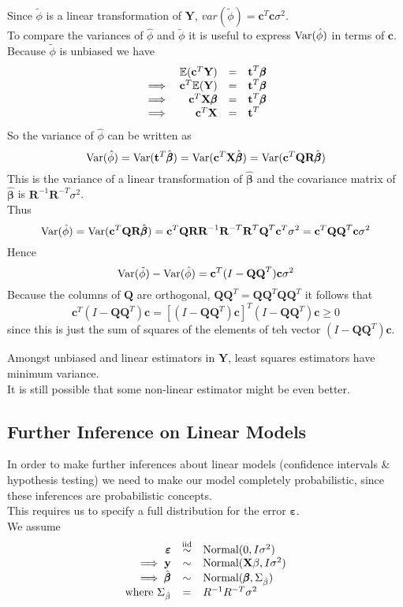 \documentclass[11pt,a4paper]{article}
\begin{document}
Since $\tilde\phi$ is a linear transformation of $\textbf{Y}$, $var(\tilde\phi)=\textbf{c}^T\textbf{c}\sigma^2$.\\
To compare the variances of $\hat\phi$ and $\tilde\phi$ it is useful to express $\mathrm{Var}(\hat\phi)$ in terms of $\textbf{c}$.\\
Because $\tilde\phi$ is unbiased we have
\[\begin{array}{rrcl}
&\mathbb{E}(\textbf{c}^T\textbf{Y})&=&\textbf{t}^T\pmb\beta\\
\implies&\textbf{c}^T\mathbb{E}(\textbf{Y})&=&\textbf{t}^T\pmb\beta\\
\implies&\textbf{c}^T\textbf{X}\pmb\beta&=&\textbf{t}^T\pmb\beta\\
\implies&\textbf{c}^T\textbf{X}&=&\textbf{t}^T
\end{array}\]
So the variance of $\hat\phi$ can be written as
$$\mathrm{Var}(\hat\phi)=\mathrm{Var}(\textbf{t}^T\hat{\pmb\beta})=\mathrm{Var}(\textbf{c}^T\textbf{X}\hat{\pmb\beta})=\mathrm{Var}(\textbf{c}^T\textbf{QR}\hat{\pmb\beta})$$
This is the variance of a linear transformation of $\hat{\pmb\beta}$ and the covariance matrix of $\hat{\pmb\beta}$ is $\textbf{R}^{-1}\textbf{R}^{-T}\sigma^2$.\\
Thus
$$\mathrm{Var}(\hat\phi)=\mathrm{Var}(\textbf{c}^T\textbf{QR}\hat{\pmb\beta})=\textbf{c}^T\textbf{QRR}^{-1}\textbf{R}^{-T}\textbf{R}^T\textbf{Q}^T\textbf{c}^T\sigma^2=\textbf{c}^T\textbf{QQ}^T\textbf{c}\sigma^2$$
Hence
$$\mathrm{Var}(\tilde\phi)-\mathrm{Var}(\hat\phi)=\textbf{c}^T(I-\textbf{QQ}^T)\textbf{c}\sigma^2$$
Because the columns of $\textbf{Q}$ are orthogonal, $\textbf{QQ}^T=\textbf{QQ}^T\textbf{QQ}^T$ it follows that
$$\textbf{c}^T(I-\textbf{QQ}^T)\textbf{c}=[(I-\textbf{QQ}^T)\textbf{c}]^T(I-\textbf{Q}\textbf{Q}^T)\textbf{c}\geq0$$
since this is just the sum of squares of the elements of teh vector $(I-\textbf{QQ}^T)\textbf{c}$.\proved

Amongst unbiased and linear estimators in $\textbf{Y}$, least squares estimators have minimum variance.\\
It is still possible that some non-linear estimator might be even better.

\subsection{Further Inference on Linear Models}

In order to make further inferences about linear models (\eg confidence intervals \& hypothesis testing) we need to make our model completely probabilistic, since these inferences are probabilistic concepts.\\
This requires us to specify a full distribution for the error $\pmb\varepsilon$.\\
We assume
\[\begin{array}{rcl}
\pmb\varepsilon&\overset{\text{iid}}{\sim}&\text{Normal}(0,I\sigma^2)\\
\implies\textbf{y}&\sim&\text{Normal}(\textbf{X}\beta,I\sigma^2)\\
\implies\hat{\pmb\beta}&\sim&\text{Normal}(\pmb\beta,\Sigma_{\hat\beta})\\
\text{where }\Sigma_{\hat\beta}&=&R^{-1}R^{-T}\sigma^2
\end{array}\]
\end{document}
